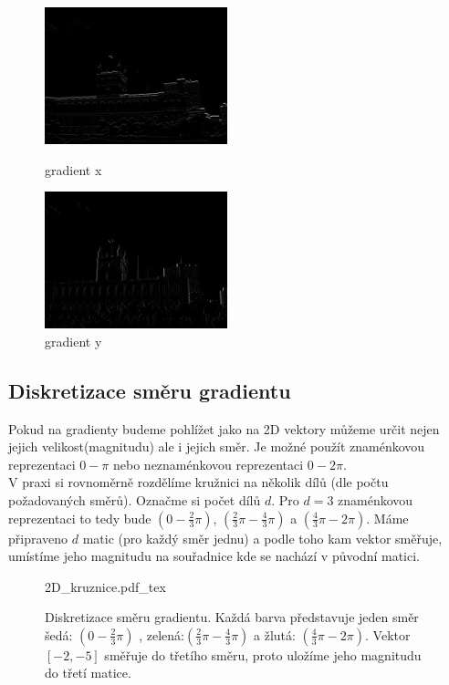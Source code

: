 \documentclass{report}
\begin{document}
\begin{figure}[H]
	\centering
	\begin{minipage}[c]{150pt}
		\centering
		\includegraphics[width=150pt]{./img/gradientX.png}
		\caption{gradient x}
	\end{minipage}
	\begin{minipage}[c]{150pt}
		\includegraphics[width=150pt]{./img/gradientY.png}
		\caption{gradient y}
		\centering
	\end{minipage}
\end{figure}

\subsection{Diskretizace směru gradientu}
Pokud na gradienty budeme pohlížet jako na 2D vektory můžeme určit nejen jejich velikost(magnitudu) ale i jejich směr. Je možné použít znaménkovou reprezentaci $0 - \pi$ nebo neznaménkovou reprezentaci $0 - 2\pi$. \\
V praxi si rovnoměrně rozdělíme kružnici na několik dílů (dle počtu požadovaných směrů). Označme si počet dílů $d$. Pro $d = 3$ znaménkovou reprezentaci to tedy bude $\left(0 - \frac{2}{3}\pi \right)$, $\left(\frac{2}{3}\pi - \frac{4}{3}\pi \right)$ a $\left(\frac{4}{3}\pi - 2\pi \right)$. Máme připraveno $d$ matic (pro každý směr jednu) a podle toho kam vektor směřuje, umístíme jeho magnitudu na souřadnice kde se nachází v původní matici. 

\begin{figure}[H]
    \centering    
    \def\svgwidth{230pt}
	{2D_kruznice.pdf_tex}    
    \caption{Diskretizace směru gradientu. Každá barva představuje jeden směr šedá: $\left(0 - \frac{2}{3}\pi \right)$ , zelená:$\left(\frac{2}{3}\pi - \frac{4}{3}\pi \right)$ a žlutá: $\left(\frac{4}{3}\pi - 2\pi \right)$. Vektor $[ -2, -5 ]$ směřuje do třetího směru, proto uložíme jeho magnitudu do třetí matice. }
    \label{fig: 2D_graf}
\end{figure}
\end{document}
